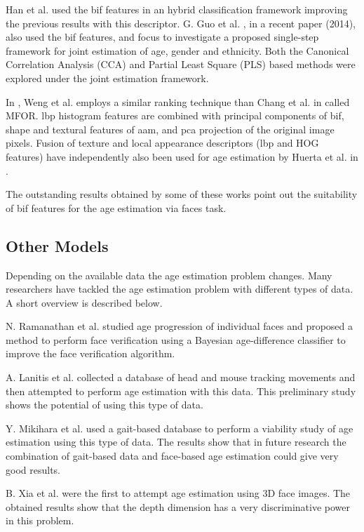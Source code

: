 Han et al. \cite{han:age} used the \gls{bif} features in an hybrid classification framework improving the previous results with this descriptor. G. Guo et al. \cite{Guo2014761}, in a recent paper (2014), also used the \gls{bif} features, and focus to investigate a proposed single-step framework for joint estimation of age, gender and ethnicity. Both the Canonical Correlation Analysis (CCA) \cite{hotelling1936relations} and Partial Least Square (PLS) based methods were explored under the joint estimation framework.

In \cite{6553772}, Weng et al. employs a similar ranking technique than Chang et al. in \cite{5995437} called MFOR. \gls{lbp} histogram features are combined with principal components of \gls{bif}, shape and textural features of \gls{aam}, and \gls{pca} projection of the original image pixels. Fusion of texture and local appearance descriptors (\gls{lbp} and HOG features) have independently also been used for age estimation by Huerta et al. in \cite{HuFerPra14}.

The outstanding results obtained by some of these works point out the suitability of \gls{bif} features for the age estimation via faces task.

\subsection{Other Models}\label{subsec:oth}

Depending on the available data the age estimation problem changes. Many researchers have tackled the age estimation problem with different types of data. A short overview is described below.

N. Ramanathan et al. \cite{1709980} studied age progression of individual faces and proposed a method to perform face verification using a Bayesian age-difference classifier to improve the face verification algorithm.

A. Lanitis et al. \cite{5463396} collected a database of head and mouse tracking movements and then attempted to perform age estimation with this data. This preliminary study shows the potential of using this type of data.

Y. Mikihara et al. \cite{6117531} used a gait-based database to perform a viability study of age estimation using this type of data. The results show that in future research the combination of gait-based data and face-based age estimation could give very good results.

B. Xia et al. \cite{xia:hal-00904007} were the first to attempt age estimation using 3D face images. The obtained results show that the depth dimension has a very discriminative power in this problem. 

